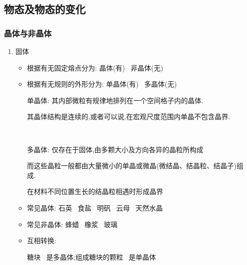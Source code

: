 \documentclass{article}
\begin{document}
\vspace{2em}

\subsection{物态及物态的变化}
\subsubsection{晶体与非晶体}
\begin{enumerate}
    \item 固体
          \begin{itemize}
              \item 根据有无固定熔点分为: 晶体(有) \, 非晶体(无)
              \item 根据有无规则的外形分为: 单晶体(有) \, 多晶体(无)

                    \vspace{-1em}
                    \hspace{-0.9em}\begin{adjustbox}{minipage=0.76\linewidth, bgcolor=gray!20, padding=1em}
                        \small %
                        单晶体: 其内部微粒有规律地排列在一个空间格子内的晶体.

                        \hspace{3.8em}其晶体结构是连续的,或者可以说,在宏观尺度范围内单晶不包含晶界.

                        \,

                        多晶体: 仅存在于固体,由多颗大小及方向各异的晶粒所构成

                        \hspace{3.8em}而这些晶粒一般都由大量微小的单晶或微晶(微结晶、结晶粒、结晶子)组成.

                        \hspace{3.8em}在材料不同位置生长的结晶粒相遇时形成晶界
                    \end{adjustbox}
                    \vspace{-1em}

              \item 常见晶体: 石英 \, 食盐 \, 明矾 \, 云母 \, 天然水晶
              \item 常见非晶体: 蜂蜡 \, 橡浆 \, 玻璃
              \item 互相转换:

                    \hspace{4.8em}糖块 \, 是多晶体;组成糖块的颗粒 \, 是单晶体


\end{itemize}
\end{enumerate}
\end{document}
